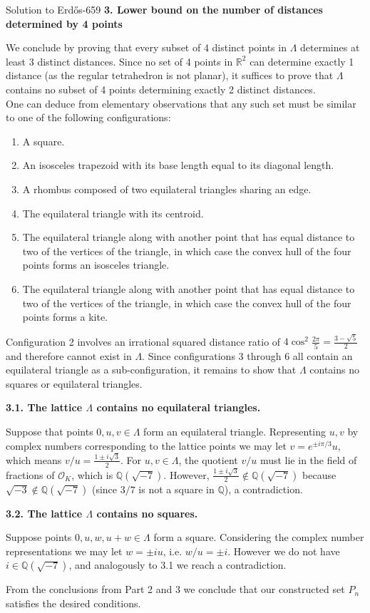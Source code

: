 \documentclass{article}
\theoremstyle{plain}
\theoremstyle{definition}
\begin{document}
\begin{solution}{Solution to {Erdős-659}}
\medskip
\textbf{3. Lower bound on the number of distances determined by 4 points}

We conclude by proving that every subset of 4 distinct points in $\Lambda$ determines at least 3 distinct distances. Since no set of 4 points in $\mathbb{R}^2$ can determine exactly 1 distance (as the regular tetrahedron is not planar), it suffices to prove that $\Lambda$ contains no subset of 4 points determining exactly 2 distinct distances.\\
One can deduce from elementary observations that any such set must be similar to one of the following configurations:
\begin{enumerate}
    \item  A square.
    \item An isosceles trapezoid with its base length equal to its diagonal length.
    \item  A rhombus composed of two equilateral triangles sharing an edge.
    \item The equilateral triangle with its centroid.
    \item The equilateral triangle along with another point that has equal distance to two of the vertices of the triangle, in which case the convex hull of the four points forms an isosceles triangle.
    \item The equilateral triangle along with another point that has equal distance to two of the vertices of the triangle, in which case the convex hull of the four points forms a kite.
\end{enumerate}
Configuration 2 involves an irrational squared distance ratio of $4\cos^{2}{\frac{2\pi}{5}}=\frac{3-\sqrt{5}}{2}$ and therefore cannot exist in $\Lambda$. Since configurations 3 through 6 all contain an equilateral triangle as a sub-configuration, it remains to show that $\Lambda$ contains no squares or equilateral triangles.

\smallskip
\textbf{3.1. The lattice $\Lambda$ contains no equilateral triangles.}

Suppose that points $0, u, v \in \Lambda$ form an equilateral triangle. Representing $u,v$ by complex numbers corresponding to the lattice points we may let $v = e^{\pm i\pi/3} u$, which means $v/u = \frac{1 \pm i\sqrt{3}}{2}$.
For $u, v \in \Lambda$, the quotient $v/u$ must lie in the field of fractions of $\mathcal{O}_K$, which is $\mathbb{Q}(\sqrt{-7})$.
However, $\frac{1 \pm i\sqrt{3}}{2} \notin \mathbb{Q}(\sqrt{-7})$ because $\sqrt{-3} \notin \mathbb{Q}(\sqrt{-7})$ (since $3/7$ is not a square in $\mathbb{Q}$), a contradiction.

\smallskip
\textbf{3.2. The lattice $\Lambda$ contains no squares.}

Suppose points $0, u, w, u+w \in \Lambda$ form a square. Considering the complex number representations we may let $w = \pm i u$, i.e. $w/u = \pm i$. However we do not have $i\in\mathbb{Q}(\sqrt{-7})$, and analogously to 3.1 we reach a contradiction.

\medskip
From the conclusions from Part 2 and 3 we conclude that our constructed set $P_n$ satisfies the desired conditions.
    
\end{solution}
\end{document}
